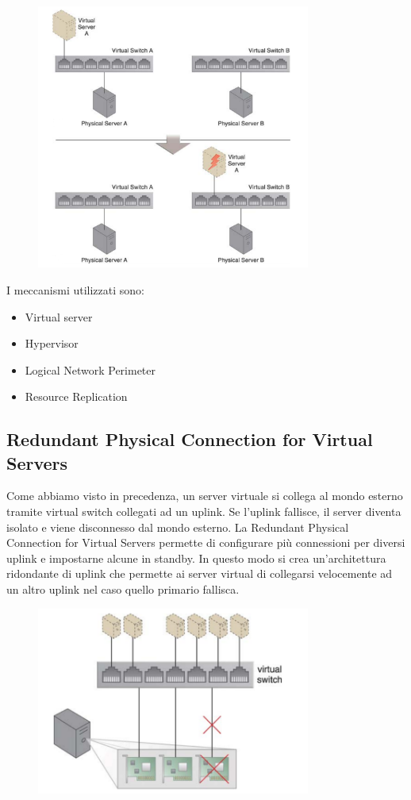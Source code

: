 \begin{figure}[htb!]
    \centering
    \includegraphics[width=9cm]{./Images/cap13/13.10.png}
\end{figure}

I meccanismi utilizzati sono:
\begin{itemize}
    \item Virtual server
    \item Hypervisor
    \item Logical Network Perimeter
    \item Resource Replication
\end{itemize}

\subsection{Redundant Physical Connection for Virtual Servers}
Come abbiamo visto in precedenza, un server virtuale si collega al mondo esterno tramite virtual switch collegati ad un uplink. Se l'uplink fallisce, il server diventa isolato e viene disconnesso dal mondo esterno. La Redundant Physical Connection for Virtual Servers permette di configurare più connessioni per diversi uplink e impostarne alcune in standby. In questo modo si crea un'architettura ridondante di uplink che permette ai server virtual di collegarsi velocemente ad un altro uplink nel caso quello primario fallisca.

\begin{figure}[htb!]
    \centering
    \includegraphics[width=9cm]{./Images/cap13/13.11.png}
\end{figure}

